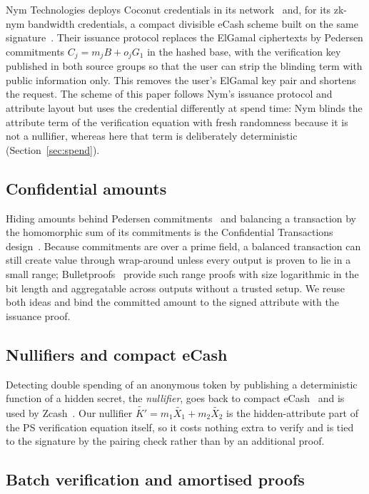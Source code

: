 \documentclass[10pt,a5paper]{article}
\newcommand{\K}[1]{#1}                      %
\newcommand{\Go}[1]{#1}                     %
\newcommand{\Gt}[1]{\tilde{#1}}             %
\newcommand{\K}[1]{{\color{ScalarCol}#1}}   %
\newcommand{\Go}[1]{{\color{GoneCol}#1}}    %
\newcommand{\Gt}[1]{{\color{GtwoCol}#1}}    %
\begin{document}
Nym Technologies deploys Coconut credentials in its network~\cite{nym} and,
for its zk-nym bandwidth credentials, a compact divisible eCash scheme built on
the same signature~\cite{rial23,nymcode}. Their issuance protocol replaces the
ElGamal ciphertexts by Pedersen commitments $\Go{C_j} = \K{m_j}\Go{B} + \K{o_j}\Go{G_1}$
in the hashed base, with the verification key published in both source groups
so that the user can strip the blinding term with public information only.
This removes the user's ElGamal key pair and shortens the request. The scheme
of this paper follows Nym's issuance protocol and attribute layout but uses the
credential differently at spend time: Nym blinds the attribute term of the
verification equation with fresh randomness because it is not a nullifier,
whereas here that term is deliberately deterministic (Section~\ref{sec:spend}).

\subsection{Confidential amounts}

Hiding amounts behind Pedersen commitments~\cite{pedersen91} and balancing a
transaction by the homomorphic sum of its commitments is the Confidential
Transactions design~\cite{maxwell15}. Because commitments are over a prime
field, a balanced transaction can still create value through wrap-around
unless every output is proven to lie in a small range; Bulletproofs~\cite{bulletproofs}
provide such range proofs with size logarithmic in the bit length and
aggregatable across outputs without a trusted setup. We reuse both ideas and
bind the committed amount to the signed attribute with the issuance proof.

\subsection{Nullifiers and compact eCash}

Detecting double spending of an anonymous token by publishing a deterministic
function of a hidden secret, the \emph{nullifier}, goes back to compact
eCash~\cite{chl05} and is used by Zcash~\cite{zcash}. Our nullifier
$\Gt{K'} = \K{m_1}\Gt{X_1} + \K{m_2}\Gt{X_2}$ is the hidden-attribute part of the
PS verification equation itself, so it costs nothing extra to verify and is
tied to the signature by the pairing check rather than by an additional proof.

\subsection{Batch verification and amortised proofs}
\end{document}
